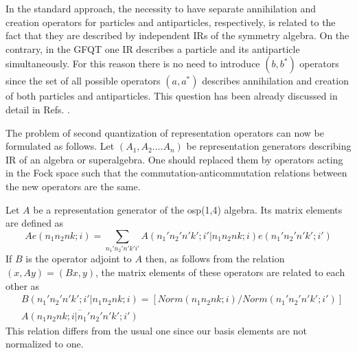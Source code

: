 \documentclass[a4paper,12pt]{article}%
\begin{document}
In the standard approach, the necessity to have separate annihilation
and creation operators for particles and antiparticles, respectively,
is related to the fact that they are described by independent IRs of
the symmetry algebra. On the contrary, in the GFQT one IR describes
a particle and its antiparticle simultaneously. For this reason there
is no need to introduce $(b,b^*)$ operators since the set of all
possible operators $(a,a^*)$ describes annihilation and creation of
both particles and antiparticles. This question has been already
discussed in detail in Refs. \cite{lev2,lev3}.

The problem of second quantization of representation operators can
now be formulated as follows. Let $(A_1,A_2....A_n)$ be representation
generators describing IR of an algebra or superalgebra. One should
replaced them by operators acting in the Fock space such that the
commutation-anticommutation relations between the new operators are
the same. 

Let $A$ be a representation generator of the osp(1,4) algebra.
Its matrix elements are defined as
\begin{equation}
Ae(n_1n_2nk;i)=\sum_{n_1'n_2'n'k'i'}
A(n_1'n_2'n'k';i'|n_1n_2nk;i)e(n_1'n_2'n'k';i')
\label{53}
\end{equation}
If $B$ is the operator adjoint to $A$ then, as follows from 
the relation $(x,Ay)=(Bx,y)$, the matrix elements of these 
operators are related to each other as
\begin{eqnarray}
&B(n_1'n_2'n'k';i'|n_1n_2nk;i)=
[Norm(n_1n_2nk;i)/Norm(n_1'n_2'n'k';i')]\nonumber\\
&\overline{A(n_1n_2nk;i|n_1'n_2'n'k';i')}
\label{54}
\end{eqnarray}
This relation differs from the usual one since our basis
elements are not normalized to one.
\end{document}
